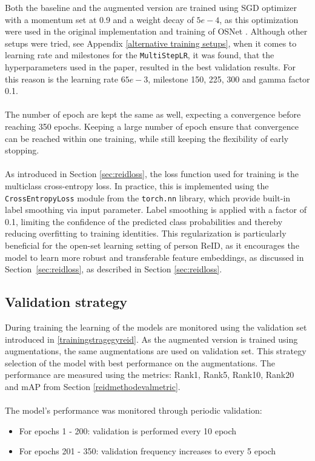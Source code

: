 \noindent Both the baseline and the augmented version are trained using \acf{SGD} optimizer with a momentum set at 0.9 and a weight decay of \(5e-4\), as this optimization were used in the original implementation and training of OSNet \cite{OSNet}. Although other setups were tried, see Appendix \ref{alternative training setups}, when it comes to learning rate and milestones for the \texttt{MultiStepLR}, it was found, that the hyperparameters used in the paper, resulted in the best validation results. For this reason is the learning rate \(65e-3\), milestone 150, 225, 300 and gamma factor 0.1.
\\\\
The number of epoch are kept the same as well, expecting a convergence before reaching 350 epochs. Keeping a large number of epoch ensure that convergence can be reached within one training, while still keeping the flexibility of early stopping.
\\\\
As introduced in Section \ref{sec:reidloss}, the loss function used for training is the multiclass cross-entropy loss. In practice, this is implemented using the \texttt{CrossEntropyLoss} module from the \texttt{torch.nn} library, which provide built-in label smoothing via input parameter. Label smoothing is applied with a factor of 0.1, limiting the confidence of the predicted class probabilities and thereby reducing overfitting to training identities. This regularization is particularly beneficial for the open-set learning setting of person \acs{ReID}, as it encourages the model to learn more robust and transferable feature embeddings, as discussed in Section~\ref{sec:reidloss}, as described in Section \ref{sec:reidloss}.

\subsection{Validation strategy}
During training the learning of the models are monitored using the validation set introduced in \ref{trainingstragegyreid}. As the augmented version is trained using augmentations, the same augmentations are used on validation set. This strategy selection of the model with best performance on the augmentations. The performance are measured using the metrics: Rank1, Rank5, Rank10, Rank20 and \acs{mAP} from Section \ref{reidmethodevalmetric}.
\\\\
The model's performance was monitored through periodic validation:
\begin{itemize}
    \item For epochs 1 - 200: validation is performed every 10 epoch
    \item For epochs 201 - 350: validation frequency increases to every 5 epoch
\end{itemize}

